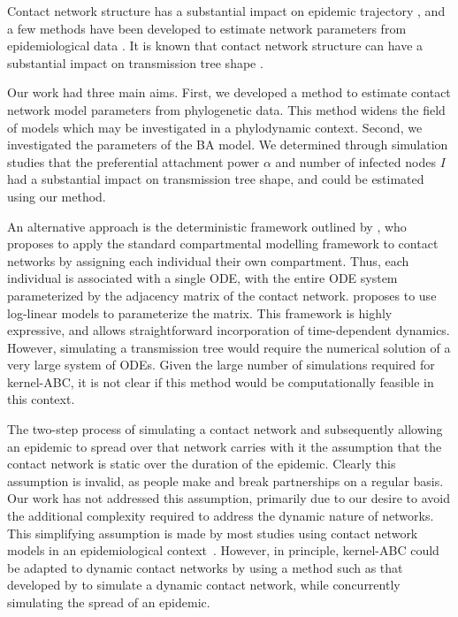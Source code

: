 Contact network structure has a substantial impact on epidemic trajectory
\autocite{barthelemy2005dynamical, volz2007susceptible, volz2008sir}, and a few
methods have been developed to estimate network parameters from epidemiological
data \autocite{volz2007susceptible, britton2002bayesian,
groendyke2011bayesian}. It is known that contact network structure can have a
substantial impact on transmission tree shape \autocite{o2010contact,
robinson2013dynamics, leventhal2012inferring, colijn2014phylogenetic,
villandre2016assessment}.

Our work had three main aims. First, we developed a method to estimate contact
network model parameters from phylogenetic data. This method widens the field
of models which may be investigated in a phylodynamic context. Second, we
investigated the parameters of the \gls{BA} model. We determined through
simulation studies that the preferential attachment power $\alpha$ and number
of infected nodes $I$ had a substantial impact on transmission tree shape, and
could be estimated using our method. 


An alternative approach is the deterministic framework outlined by
\textcite{morris1993epidemiology}, who proposes to apply the standard
compartmental modelling framework to contact networks by assigning each
individual their own compartment. Thus, each individual is associated with a
single \gls{ODE}, with the entire \gls{ODE} system parameterized by the
adjacency matrix of the contact network. \citeauthor{morris1993epidemiology}
proposes to use log-linear models to parameterize the matrix. This framework is
highly expressive, and allows straightforward incorporation of time-dependent
dynamics. However, simulating a transmission tree would require the numerical
solution of a very large system of \glspl{ODE}. Given the large number of
simulations required for kernel-\gls{ABC}, it is not clear if this method would
be computationally feasible in this context.


The two-step process of simulating a contact network and subsequently allowing
an epidemic to spread over that network carries with it the assumption that the
contact network is static over the duration of the epidemic. Clearly this
assumption is invalid, as people make and break partnerships on a regular
basis. Our work has not addressed this assumption, primarily due to our desire
to avoid the additional complexity required to address the dynamic nature of
networks. This simplifying assumption is made by most studies using contact
network models in an epidemiological context~\autocite{welch2011statistical,
bansal2007individual}. However, in principle, kernel-\gls{ABC} could be
adapted to dynamic contact networks by using a method such as that developed by
\textcite{robinson2012dynamics} to simulate a dynamic contact network, while
concurrently simulating the spread of an epidemic.

